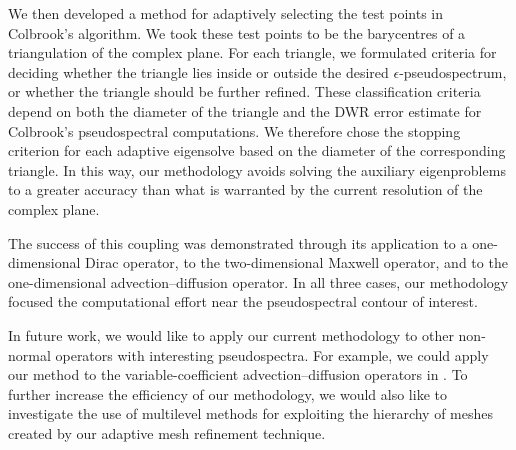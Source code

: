 We then developed a method for adaptively selecting the test points in Colbrook's algorithm. We took these test points to be the barycentres of a triangulation of the complex plane. For each triangle, we formulated criteria for deciding whether the triangle lies inside or outside the desired $\epsilon$-pseudospectrum, or whether the triangle should be further refined. These classification criteria depend on both the diameter of the triangle and the DWR error estimate for Colbrook's pseudospectral computations. We therefore chose the stopping criterion for each adaptive eigensolve based on the diameter of the corresponding triangle. In this way, our methodology avoids solving the auxiliary eigenproblems to a greater accuracy than what is warranted by the current resolution of the complex plane. 



The success of this coupling was demonstrated through its application to a one-dimensional Dirac operator, to the two-dimensional Maxwell operator, and to the one-dimensional advection--diffusion operator. In all three cases, our methodology focused the computational effort near the pseudospectral contour of interest. 

 In future work,  we would like to apply our current methodology to other non-normal operators with interesting pseudospectra. For example, we could apply our method to the variable-coefficient advection--diffusion operators in \cite[Section~3.12]{Nick}. To further increase the efficiency of our methodology, we would also like to investigate the use of multilevel methods for exploiting the hierarchy of meshes created by our adaptive mesh refinement technique. 
 
